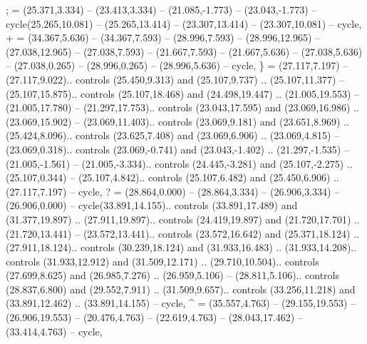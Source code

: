 {;} = {(25.371,3.334) -- (23.413,3.334) -- (21.085,-1.773) -- (23.043,-1.773) -- cycle(25.265,10.081) -- (25.265,13.414) -- (23.307,13.414) -- (23.307,10.081) -- cycle},
{+} = {(34.367,5.636) -- (34.367,7.593) -- (28.996,7.593) -- (28.996,12.965) -- (27.038,12.965) -- (27.038,7.593) -- (21.667,7.593) -- (21.667,5.636) -- (27.038,5.636) -- (27.038,0.265) -- (28.996,0.265) -- (28.996,5.636) -- cycle},
{\}} = {(27.117,7.197) -- (27.117,9.022).. controls (25.450,9.313) and (25.107,9.737) .. (25.107,11.377) -- (25.107,15.875).. controls (25.107,18.468) and (24.498,19.447) .. (21.005,19.553) -- (21.005,17.780) -- (21.297,17.753).. controls (23.043,17.595) and (23.069,16.986) .. (23.069,15.902) -- (23.069,11.403).. controls (23.069,9.181) and (23.651,8.969) .. (25.424,8.096).. controls (23.625,7.408) and (23.069,6.906) .. (23.069,4.815) -- (23.069,0.318).. controls (23.069,-0.741) and (23.043,-1.402) .. (21.297,-1.535) -- (21.005,-1.561) -- (21.005,-3.334).. controls (24.445,-3.281) and (25.107,-2.275) .. (25.107,0.344) -- (25.107,4.842).. controls (25.107,6.482) and (25.450,6.906) .. (27.117,7.197) -- cycle},
{?} = {(28.864,0.000) -- (28.864,3.334) -- (26.906,3.334) -- (26.906,0.000) -- cycle(33.891,14.155).. controls (33.891,17.489) and (31.377,19.897) .. (27.911,19.897).. controls (24.419,19.897) and (21.720,17.701) .. (21.720,13.441) -- (23.572,13.441).. controls (23.572,16.642) and (25.371,18.124) .. (27.911,18.124).. controls (30.239,18.124) and (31.933,16.483) .. (31.933,14.208).. controls (31.933,12.912) and (31.509,12.171) .. (29.710,10.504).. controls (27.699,8.625) and (26.985,7.276) .. (26.959,5.106) -- (28.811,5.106).. controls (28.837,6.800) and (29.552,7.911) .. (31.509,9.657).. controls (33.256,11.218) and (33.891,12.462) .. (33.891,14.155) -- cycle},
{^} = {(35.557,4.763) -- (29.155,19.553) -- (26.906,19.553) -- (20.476,4.763) -- (22.619,4.763) -- (28.043,17.462) -- (33.414,4.763) -- cycle},
